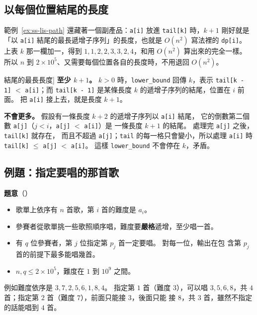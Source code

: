 \subsection{以每個位置結尾的長度}
\label{sec:ss-lis-each}

範例~\ref{ex:ss-lis-path} 還藏著一個副產品：\texttt{a[i]} 放進 \texttt{tail[k]}
時，$k + 1$ 剛好就是「以 \texttt{a[i]} 結尾的最長遞增子序列」的長度，也就是
$O(n^2)$ 寫法裡的 \texttt{dp[i]}。 上表 $k$ 那一欄加一，得到
$1, 1, 2, 2, 3, 3, 2, 4$，和用 $O(n^2)$ 算出來的完全一樣。 所以 $n$ 到
$2 \times 10^5$、又需要每個位置各自的長度時，不用退回 $O(n^2)$。

\begin{whybox}[$k + 1$ 為什麼剛好是以 a[i] 結尾的最長長度]
\textbf{至少 $k + 1$。} $k > 0$ 時，\texttt{lower\_bound} 回傳 $k$，表示
\texttt{tail[k - 1]} $<$ \texttt{a[i]}；而 \texttt{tail[k - 1]} 是某條長度
$k$ 的遞增子序列的結尾，位置在 $i$ 前面。 把 \texttt{a[i]} 接上去，就是長度
$k + 1$。

\textbf{不會更多。} 假設有一條長度 $k + 2$ 的遞增子序列以 \texttt{a[i]} 結尾，
它的倒數第二個數 \texttt{a[j]}（$j < i$，\texttt{a[j]} $<$ \texttt{a[i]}）是
一條長度 $k + 1$ 的結尾。 處理完 \texttt{a[j]} 之後，\texttt{tail[k]} 就存在，
而且不超過 \texttt{a[j]}；\texttt{tail} 的每一格只會變小，所以處理
\texttt{a[i]} 時 \texttt{tail[k]} $\le$ \texttt{a[j]} $<$ \texttt{a[i]}。
這樣 \texttt{lower\_bound} 不會停在 $k$，矛盾。
\end{whybox}

\subsection{例題：指定要唱的那首歌}
\label{sec:ss-ex-sing}

\textbf{題意}（）

\begin{itemize}
\item 歌單上依序有 $n$ 首歌，第 $i$ 首的難度是 $a_i$。
\item 參賽者從歌單挑一些歌照順序唱，難度要\textbf{嚴格}遞增，至少唱一首。
\item 有 $q$ 位參賽者，第 $j$ 位指定第 $p_j$ 首一定要唱。 對每一位，輸出在包
含第 $p_j$ 首的前提下最多能唱幾首。
\item $n, q \le 2 \times 10^5$，難度在 $1$ 到 $10^9$ 之間。
\end{itemize}

例如難度依序是 $3, 7, 2, 5, 6, 1, 8, 4$。 指定第 $1$ 首（難度 $3$），可以唱
$3, 5, 6, 8$，共 $4$ 首；指定第 $2$ 首（難度 $7$），前面只能接 $3$，後面只能
接 $8$，共 $3$ 首，雖然不指定的話能唱到 $4$ 首。

